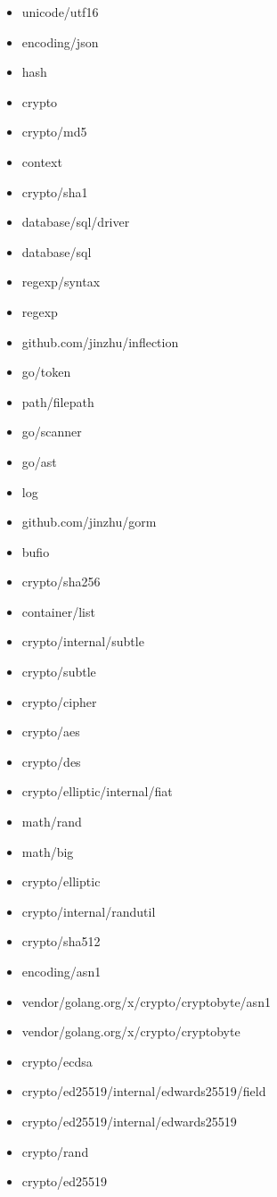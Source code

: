 \begin{itemize}
    \item unicode/utf16
    \item encoding/json
    \item hash
    \item crypto
    \item crypto/md5
    \item context
    \item crypto/sha1
    \item database/sql/driver
    \item database/sql
    \item regexp/syntax
    \item regexp
    \item github.com/jinzhu/inflection
    \item go/token
    \item path/filepath
    \item go/scanner
    \item go/ast
    \item log
    \item github.com/jinzhu/gorm
    \item bufio
    \item crypto/sha256
    \item container/list
    \item crypto/internal/subtle
    \item crypto/subtle
    \item crypto/cipher
    \item crypto/aes
    \item crypto/des
    \item crypto/elliptic/internal/fiat
    \item math/rand
    \item math/big
    \item crypto/elliptic
    \item crypto/internal/randutil
    \item crypto/sha512
    \item encoding/asn1
    \item vendor/golang.org/x/crypto/cryptobyte/asn1
    \item vendor/golang.org/x/crypto/cryptobyte
    \item crypto/ecdsa
    \item crypto/ed25519/internal/edwards25519/field
    \item crypto/ed25519/internal/edwards25519
    \item crypto/rand
    \item crypto/ed25519

\end{itemize}

